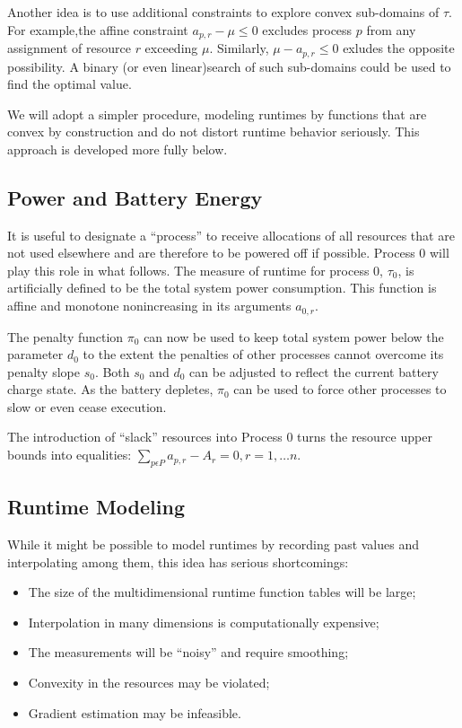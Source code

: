 Another idea is to use additional constraints to explore convex sub-domains of $\tau$.
For example,the affine constraint $a_{p,r} - \mu \leq 0$ excludes process $p$ from any assignment of resource $r$ exceeding $\mu$.  Similarly, $\mu - a_{p,r} \leq 0$ exludes the opposite possibility.
A binary (or even linear)search of such sub-domains could be used to find the optimal value.

We will adopt a simpler procedure, modeling runtimes by functions that are convex by construction
and do not distort runtime behavior seriously.  This approach is developed more fully below.

\subsection*{Power and Battery Energy}

It is useful to designate a ``process'' to receive allocations of all resources
that are not used elsewhere and are therefore to be powered off if possible.
Process 0 will play this role in what follows.
The measure of runtime for process 0, $\tau_0$,
is artificially defined to be the total system power consumption.
This function is affine and monotone nonincreasing in its arguments $a_{0,r}$.

The penalty function $\pi_0$ can now be used to keep total system power below the parameter $d_0$
to the extent the penalties of other processes cannot overcome its penalty slope $s_0$.
Both $s_0$ and $d_0$ can be adjusted to reflect the current battery charge state.
As the battery depletes, $\pi_0$ can be used to force other processes to slow or even cease execution.

The introduction of ``slack'' resources into Process 0 turns the resource upper bounds into equalities:
$\sum_{p\epsilon P} a_{p,r} - A_r = 0, r = 1,\dots n$.

\subsection*{Runtime Modeling}

While it might be possible to model runtimes by recording past values and interpolating among them,
this idea has serious shortcomings:
\begin{itemize}
\item The size of the multidimensional runtime function tables will be large;
\item Interpolation in many dimensions is computationally expensive;
\item The measurements will be “noisy” and require smoothing;
\item Convexity in the resources may be violated;
\item Gradient estimation may be infeasible.
\end{itemize}

